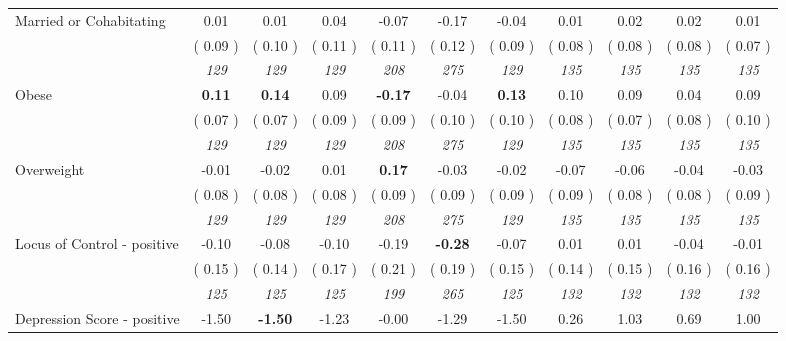 \begin{tabular}{l c c c c c c c c c c}
Married or Cohabitating &      0.01 &      0.01 &      0.04 &     -0.07 &     -0.17 &     -0.04 &      0.01 &      0.02 &      0.02 &      0.01 \\
& (     0.09 ) & (     0.10 ) & (     0.11 ) & (     0.11 ) & (     0.12 ) & (     0.09 ) & (     0.08 ) & (     0.08 ) & (     0.08 ) & (     0.07 ) \\
& \textit{ 129 } & \textit{ 129 } & \textit{ 129 } & \textit{ 208 } & \textit{ 275 } & \textit{ 129 } & \textit{ 135 } & \textit{ 135 } & \textit{ 135 } & \textit{ 135 } \\
Obese & \textbf{      0.11 } & \textbf{      0.14 } &      0.09 & \textbf{     -0.17 } &     -0.04 & \textbf{     0.13} &      0.10 &      0.09 &      0.04 &      0.09 \\
& (     0.07 ) & (     0.07 ) & (     0.09 ) & (     0.09 ) & (     0.10 ) & (     0.10 ) & (     0.08 ) & (     0.07 ) & (     0.08 ) & (     0.10 ) \\
& \textit{ 129 } & \textit{ 129 } & \textit{ 129 } & \textit{ 208 } & \textit{ 275 } & \textit{ 129 } & \textit{ 135 } & \textit{ 135 } & \textit{ 135 } & \textit{ 135 } \\
Overweight &     -0.01 &     -0.02 &      0.01 & \textbf{      0.17 } &     -0.03 &     -0.02 &     -0.07 &     -0.06 &     -0.04 &     -0.03 \\
& (     0.08 ) & (     0.08 ) & (     0.08 ) & (     0.09 ) & (     0.09 ) & (     0.09 ) & (     0.09 ) & (     0.08 ) & (     0.08 ) & (     0.09 ) \\
& \textit{ 129 } & \textit{ 129 } & \textit{ 129 } & \textit{ 208 } & \textit{ 275 } & \textit{ 129 } & \textit{ 135 } & \textit{ 135 } & \textit{ 135 } & \textit{ 135 } \\
Locus of Control - positive &     -0.10 &     -0.08 &     -0.10 &     -0.19 & \textbf{     -0.28 } &     -0.07 &      0.01 &      0.01 &     -0.04 &     -0.01 \\
& (     0.15 ) & (     0.14 ) & (     0.17 ) & (     0.21 ) & (     0.19 ) & (     0.15 ) & (     0.14 ) & (     0.15 ) & (     0.16 ) & (     0.16 ) \\
& \textit{ 125 } & \textit{ 125 } & \textit{ 125 } & \textit{ 199 } & \textit{ 265 } & \textit{ 125 } & \textit{ 132 } & \textit{ 132 } & \textit{ 132 } & \textit{ 132 } \\
Depression Score - positive &     -1.50 & \textbf{     -1.50 } &     -1.23 &     -0.00 &     -1.29 &     -1.50 &      0.26 &      1.03 &      0.69 &      1.00 \\

\end{tabular}
